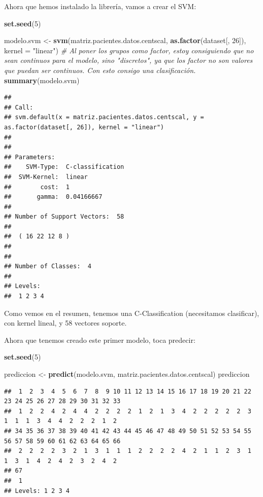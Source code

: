 \documentclass[]{article}
\newenvironment{Shaded}{\begin{snugshade}}{\end{snugshade}}
\newcommand{\KeywordTok}[1]{\textcolor[rgb]{0.13,0.29,0.53}{\textbf{#1}}}
\newcommand{\DataTypeTok}[1]{\textcolor[rgb]{0.13,0.29,0.53}{#1}}
\newcommand{\DecValTok}[1]{\textcolor[rgb]{0.00,0.00,0.81}{#1}}
\newcommand{\StringTok}[1]{\textcolor[rgb]{0.31,0.60,0.02}{#1}}
\newcommand{\CommentTok}[1]{\textcolor[rgb]{0.56,0.35,0.01}{\textit{#1}}}
\newcommand{\NormalTok}[1]{#1}
\begin{document}
Ahora que hemos instalado la librería, vamos a crear el SVM:

\begin{Shaded}
\begin{Highlighting}[]
\KeywordTok{set.seed}\NormalTok{(}\DecValTok{5}\NormalTok{)}

\NormalTok{modelo.svm <-}\StringTok{ }\KeywordTok{svm}\NormalTok{(matriz.pacientes.datos.centscal, }\KeywordTok{as.factor}\NormalTok{(dataset[, }\DecValTok{26}\NormalTok{]), }\DataTypeTok{kernel =} \StringTok{"linear"}\NormalTok{) }\CommentTok{# Al poner los grupos como factor, estoy consiguiendo que no sean continuos para el modelo, sino "discretos", ya que los factor no son valores que puedan ser continuos. Con esto consigo una clasificación.}
\KeywordTok{summary}\NormalTok{(modelo.svm)}
\end{Highlighting}
\end{Shaded}

\begin{verbatim}
## 
## Call:
## svm.default(x = matriz.pacientes.datos.centscal, y = as.factor(dataset[, 26]), kernel = "linear")
## 
## 
## Parameters:
##    SVM-Type:  C-classification 
##  SVM-Kernel:  linear 
##        cost:  1 
##       gamma:  0.04166667 
## 
## Number of Support Vectors:  58
## 
##  ( 16 22 12 8 )
## 
## 
## Number of Classes:  4 
## 
## Levels: 
##  1 2 3 4
\end{verbatim}

Como vemos en el resumen, tenemos una C-Classification (necesitamos
clasificar), con kernel lineal, y 58 vectores soporte.

Ahora que tenemos creado este primer modelo, toca predecir:

\begin{Shaded}
\begin{Highlighting}[]
\KeywordTok{set.seed}\NormalTok{(}\DecValTok{5}\NormalTok{)}

\NormalTok{prediccion <-}\StringTok{ }\KeywordTok{predict}\NormalTok{(modelo.svm, matriz.pacientes.datos.centscal)}
\NormalTok{prediccion}
\end{Highlighting}
\end{Shaded}

\begin{verbatim}
##  1  2  3  4  5  6  7  8  9 10 11 12 13 14 15 16 17 18 19 20 21 22 23 24 25 26 27 28 29 30 31 32 33 
##  1  2  2  4  2  4  4  2  2  2  2  1  2  1  3  4  2  2  2  2  2  3  1  1  1  3  4  4  2  2  2  1  2 
## 34 35 36 37 38 39 40 41 42 43 44 45 46 47 48 49 50 51 52 53 54 55 56 57 58 59 60 61 62 63 64 65 66 
##  2  2  2  2  3  2  1  3  1  1  1  2  2  2  2  4  2  1  1  2  3  1  1  3  1  4  2  4  2  3  2  4  2 
## 67 
##  1 
## Levels: 1 2 3 4
\end{verbatim}
\end{document}
